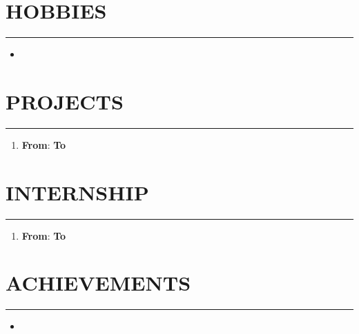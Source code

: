 \documentclass{article}
\newcommand{\VAR}[1]{}
\newcommand{\BLOCK}[1]{}
\begin{document}
\section*{\large{\uppercase{Hobbies}}}
\hrule
\vspace{3pt}
\begin{itemize}[noitemsep,nolistsep]
\BLOCK{ for x in hobby }
	\BLOCK{ if x != '' }
		\item \VAR{x}
	\BLOCK{ endif }
\BLOCK{ endfor }	
\end{itemize}
\BLOCK{ endif }
\vspace{3pt}
\BLOCK{ if items[0]['proname'] != '' }
\section*{\large{\uppercase{projects}}}
\hrule
\vspace{3pt}

\begin{enumerate}
\BLOCK{ for i in items } 
	\BLOCK{ if i['proname'] != '' }
	\item {\textbf{\VAR{i['proname']}}}\hfill {\textbf{From}}: \VAR{i['profrom']} {\textbf{To}} \VAR{i['proto']}\\
	\VAR{i['prodescription']}
	\BLOCK{ endif }
\BLOCK{ endfor }
\end{enumerate}
\BLOCK{ endif }
\vspace{3pt}
\BLOCK{ if ship[0]['intitle'] != '' }
\section*{\large{\uppercase{Internship}}}
\hrule
\vspace{3pt}
\begin{enumerate}
\BLOCK{ for i in ship } 
	\BLOCK{ if i['intitle'] != '' }
	\item {\textbf{\VAR{i['intitle']}}}\hfill {\textbf{From}}: \VAR{i['infrom']} {\textbf{To}} \VAR{i['into']}\\
	\VAR{i['indescription']}
	\BLOCK{ endif }
\BLOCK{ endfor }
\end{enumerate}
\BLOCK{ endif }
\vspace{3pt}
\BLOCK{ if achievement[0] != '' }
\section*{\large{\uppercase{achievements}}}
\hrule
\vspace{3pt}
\begin{itemize}[noitemsep,nolistsep]
\BLOCK{ for x in achievement }
	\BLOCK{ if x != '' }
		\item \VAR{x}
	\BLOCK{ endif }
\BLOCK{ endfor }
\end{itemize}
\BLOCK{ endif }
\vspace{3pt}
\end{document}
